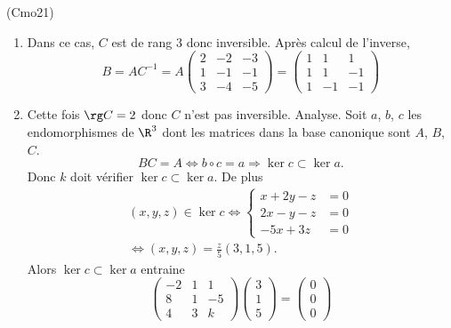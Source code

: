 \begin{tiny}(Cmo21)\end{tiny}
\begin{enumerate}
 \item Dans ce cas, $C$ est de rang $3$ donc inversible. Après calcul de l'inverse, 
\begin{displaymath}
 B=AC^{-1}= A
\begin{pmatrix}
 2 & -2 & -3 \\1 & -1 & -1 \\ 3 & -4 & -5
\end{pmatrix}
=
\begin{pmatrix}
 1 & 1 & 1 \\1 & 1 & -1 \\ 1 & -1 & -1
\end{pmatrix}
\end{displaymath}
\item Cette fois $\rg C = 2$ donc $C$ n'est pas inversible.\newline
Analyse.\newline
Soit $a$, $b$, $c$ les endomorphismes de $\R^3$ dont les matrices dans la base canonique sont $A$, $B$, $C$.
\begin{displaymath}
 BC=A \Leftrightarrow b\circ c = a \Rightarrow \ker c \subset \ker a.
\end{displaymath}
Donc $k$ doit vérifier $\ker c \subset \ker a$. De plus
\begin{multline*}
 (x,y,z)\in \ker c \Leftrightarrow
\left\lbrace  
\begin{aligned}
 x+2y-z&=0\\2x-y-z &=0\\-5x + 3z &=0
\end{aligned}
\right. \\
\Leftrightarrow (x,y,z)=\frac{z}{5}(3,1,5).
\end{multline*}
Alors $\ker c \subset \ker a$ entraine
\begin{displaymath}
\begin{pmatrix}
-2 & 1 & 1 \\ 8 & 1 & -5 \\ 4 & 3 & k 
\end{pmatrix}
\begin{pmatrix}
 3\\1\\5
\end{pmatrix}
=
\begin{pmatrix}
 0\\0\\0

\end{pmatrix}
\end{displaymath}
\end{enumerate}
